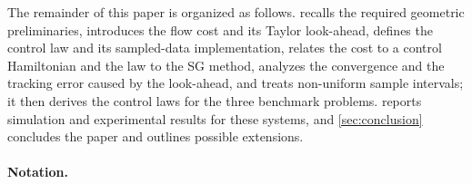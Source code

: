 The remainder of this paper is organized as follows.
 recalls the required geometric preliminaries, introduces the flow cost and
its Taylor look-ahead, defines the control law and its sampled-data implementation, relates the
cost to a control Hamiltonian and the law to the SG method, analyzes the convergence and the
tracking error caused by the look-ahead, and treats non-uniform sample intervals; it then derives
the control laws for the three benchmark problems.
 reports simulation and experimental results for these systems, and
\cref{sec:conclusion} concludes the paper and outlines possible extensions.

\paragraph{Notation.}
